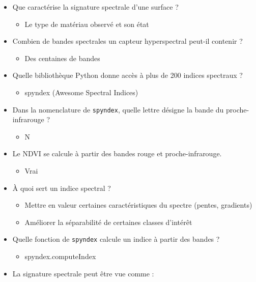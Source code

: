 \documentclass[
  french,
  11pt,
  letterpaper,
  open=any,
  twoside=false,
  french]{scrbook}
\providecommand{\tightlist}{%
  \setlength{\itemsep}{0pt}\setlength{\parskip}{0pt}}
\begin{document}
\begin{itemize}
\tightlist
\item
  Que caractérise la signature spectrale d'une surface ?

  \begin{itemize}
  \tightlist
  \item
    Le type de matériau observé et son état
  \end{itemize}
\item
  Combien de bandes spectrales un capteur hyperspectral peut-il contenir
  ?

  \begin{itemize}
  \tightlist
  \item
    Des centaines de bandes
  \end{itemize}
\item
  Quelle bibliothèque Python donne accès à plus de 200 indices spectraux
  ?

  \begin{itemize}
  \tightlist
  \item
    spyndex (Awesome Spectral Indices)
  \end{itemize}
\item
  Dans la nomenclature de \texttt{spyndex}, quelle lettre désigne la
  bande du proche-infrarouge ?

  \begin{itemize}
  \tightlist
  \item
    N
  \end{itemize}
\item
  Le NDVI se calcule à partir des bandes rouge et proche-infrarouge.

  \begin{itemize}
  \tightlist
  \item
    Vrai
  \end{itemize}
\item
  À quoi sert un indice spectral ?

  \begin{itemize}
  \tightlist
  \item
    Mettre en valeur certaines caractéristiques du spectre (pentes,
    gradients)
  \item
    Améliorer la séparabilité de certaines classes d'intérêt
  \end{itemize}
\item
  Quelle fonction de \texttt{spyndex} calcule un indice à partir des
  bandes ?

  \begin{itemize}
  \tightlist
  \item
    spyndex.computeIndex
  \end{itemize}
\item
  La signature spectrale peut être vue comme :


\end{itemize}
\end{document}
